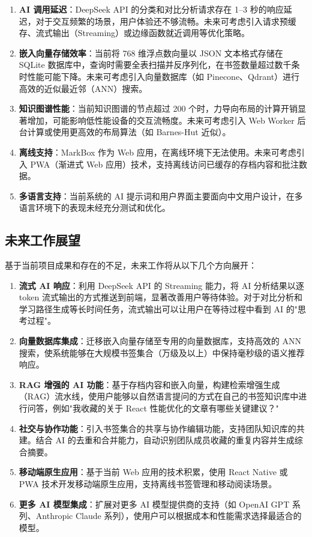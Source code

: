 \documentclass[12pt,a4paper]{ctexart}
\begin{document}
\begin{enumerate}
  \item \textbf{AI 调用延迟}：DeepSeek API 的分类和对比分析请求存在 1--3 秒的响应延迟，对于交互频繁的场景，用户体验还不够流畅。未来可考虑引入请求预缓存、流式输出（Streaming）或边缘函数就近调用等优化策略。
  \item \textbf{嵌入向量存储效率}：当前将 768 维浮点数向量以 JSON 文本格式存储在 SQLite 数据库中，查询时需要全表扫描并反序列化，在书签数量超过数千条时性能可能下降。未来可考虑引入向量数据库（如 Pinecone、Qdrant）进行高效的近似最近邻（ANN）搜索。
  \item \textbf{知识图谱性能}：当前知识图谱的节点超过 200 个时，力导向布局的计算开销显著增加，可能影响低性能设备的交互流畅度。未来可考虑引入 Web Worker 后台计算或使用更高效的布局算法（如 Barnes-Hut 近似）。
  \item \textbf{离线支持}：MarkBox 作为 Web 应用，在离线环境下无法使用。未来可考虑引入 PWA（渐进式 Web 应用）技术，支持离线访问已缓存的存档内容和批注数据。
  \item \textbf{多语言支持}：当前系统的 AI 提示词和用户界面主要面向中文用户设计，在多语言环境下的表现未经充分测试和优化。
\end{enumerate}

\subsection{未来工作展望}

基于当前项目成果和存在的不足，未来工作将从以下几个方向展开：

\begin{enumerate}
  \item \textbf{流式 AI 响应}：利用 DeepSeek API 的 Streaming 能力，将 AI 分析结果以逐 token 流式输出的方式推送到前端，显著改善用户等待体验。对于对比分析和学习路径生成等长时间任务，流式输出可以让用户在等待过程中看到 AI 的"思考过程"。
  \item \textbf{向量数据库集成}：迁移嵌入向量存储至专用的向量数据库，支持高效的 ANN 搜索，使系统能够在大规模书签集合（万级及以上）中保持毫秒级的语义推荐响应。
  \item \textbf{RAG 增强的 AI 功能}：基于存档内容和嵌入向量，构建检索增强生成（RAG）流水线，使用户能够以自然语言提问的方式在自己的书签知识库中进行问答，例如"我收藏的关于 React 性能优化的文章有哪些关键建议？"
  \item \textbf{社交与协作功能}：引入书签集合的共享与协作编辑功能，支持团队知识库的共建。结合 AI 的去重和合并能力，自动识别团队成员收藏的重复内容并生成综合摘要。
  \item \textbf{移动端原生应用}：基于当前 Web 应用的技术积累，使用 React Native 或 PWA 技术开发移动端原生应用，支持离线书签管理和移动阅读场景。
  \item \textbf{更多 AI 模型集成}：扩展对更多 AI 模型提供商的支持（如 OpenAI GPT 系列、Anthropic Claude 系列），使用户可以根据成本和性能需求选择最适合的模型。
\end{enumerate}
\end{document}
